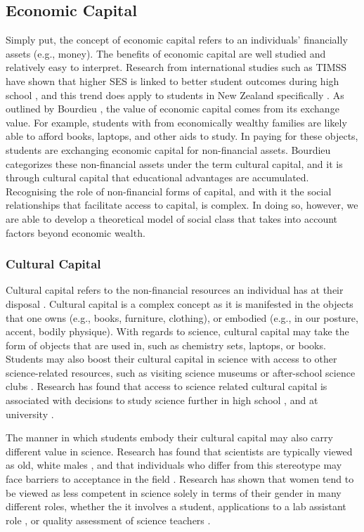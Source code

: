 \subsection*{Economic Capital}
Simply put, the concept of economic capital refers to an individuals' financially assets (e.g., money). The benefits of economic capital are well studied and relatively easy to interpret. Research from international studies such as TIMSS have shown that higher SES is linked to better student outcomes during high school \cite{Mullis_2012,mullis2016timss}, and this trend does apply to students in New Zealand specifically \cite{May_2016}. As outlined by Bourdieu \cite{Bourdieu_1986}, the value of economic capital comes from its exchange value. For example, students with from economically wealthy families are likely able to afford books, laptops, and other aids to study. In paying for these objects, students are exchanging economic capital for non-financial assets. Bourdieu categorizes these non-financial assets under the term cultural capital, and it is through cultural capital that educational advantages are accumulated. Recognising the role of non-financial forms of capital, and with it the social relationships that facilitate access to capital, is complex. In doing so, however, we are able to develop a theoretical model of social class that takes into account factors beyond economic wealth. 

\subsubsection*{Cultural Capital}
Cultural capital refers to the non-financial resources an individual has at their disposal \cite{Bourdieu_1986}. Cultural capital is a complex concept as it is manifested in the objects that one owns (e.g., books, furniture, clothing), or embodied (e.g., in our posture, accent, bodily physique). With regards to science, cultural capital may take the form of objects that are used in, such as chemistry sets, laptops, or books. Students may also boost their cultural capital in science with access to other science-related resources, such as visiting science museums \cite{Dawson2014} or after-school science clubs \cite{mujtaba2018students}. Research has found that access to science related cultural capital is associated with decisions to study science further in high school \cite{mujtaba2018students}, and at university \cite{Lyons_2006}.

The manner in which students embody their cultural capital may also carry different value in science. Research has found that scientists are typically viewed as old, white males \cite{Nosek_2009, Barthelemy_2016}, and that individuals who differ from this stereotype may face barriers to acceptance in the field \cite{ong2005body}. Research has shown that women tend to be viewed as less competent in science solely in terms of their gender in many different roles, whether the it involves a student, applications to a lab assistant role \cite{Moss_2012}, or quality assessment of science teachers \cite{Potvin_2016}. 

